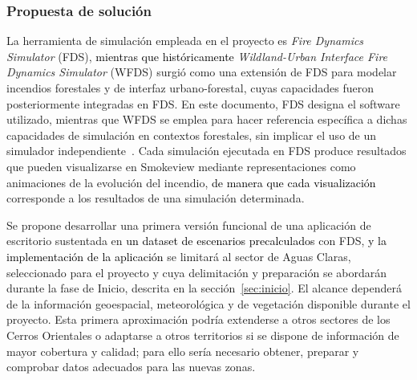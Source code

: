 \subsubsection{Propuesta de solución}\label{sec:solucion}
La herramienta de simulación empleada en el proyecto es \textit{Fire Dynamics Simulator} (FDS), \textcolor{black}{mientras que históricamente} \textit{Wildland-Urban Interface Fire Dynamics Simulator} (WFDS) surgió como una extensión de FDS para modelar incendios forestales y de interfaz urbano-forestal, cuyas capacidades fueron posteriormente integradas en FDS. En este documento, FDS designa el software utilizado, mientras que WFDS se emplea para hacer referencia específica a dichas capacidades de simulación en contextos forestales, sin implicar el uso de un simulador independiente~\cite{fdsnist,wfdsusfs}. Cada simulación ejecutada en FDS produce resultados que pueden visualizarse en Smokeview mediante representaciones como animaciones de la evolución del incendio, \textcolor{black}{de manera que cada visualización} corresponde a los resultados de una simulación determinada.

Se propone desarrollar una primera versión funcional de una aplicación de escritorio sustentada en \textcolor{black}{un dataset de escenarios precalculados} con FDS, \textcolor{black}{y la implementación de la aplicación} se limitará al sector de Aguas Claras, seleccionado para el proyecto y cuya delimitación y preparación se abordarán durante la fase de Inicio, descrita en la sección~\ref{sec:inicio}. El alcance dependerá de la información geoespacial, meteorológica y de vegetación disponible durante el proyecto. Esta primera aproximación podría extenderse a otros sectores de los Cerros Orientales o adaptarse a otros territorios si se dispone de información de mayor cobertura y calidad; para ello sería necesario obtener, preparar y comprobar datos adecuados para las nuevas zonas.

